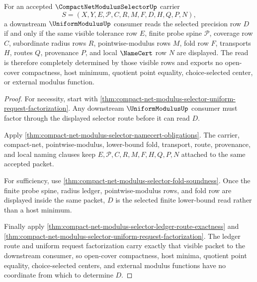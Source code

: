 \begin{theorem}
\label{thm:compact-net-modulus-selector-selected-precision-exactness}
For an accepted $\CompactNetModulusSelectorUp$ carrier
$$
S=(X,Y,E,\mathcal{P},C,R,M,F,D,H,Q,P,N),
$$
a downstream $\UniformModulusUp$ consumer reads the selected precision row $D$
if and only if the same visible tolerance row $E$, finite probe spine
$\mathcal{P}$, coverage row $C$, subordinate radius rows $R$,
pointwise-modulus rows $M$, fold row $F$, transports $H$, routes $Q$,
provenance $P$, and local $\NameCert$ row $N$ are displayed. The read is
therefore completely determined by those visible rows and exports no
open-cover compactness, host minimum, quotient point equality,
choice-selected center, or external modulus function.
\end{theorem}
\begin{proof}
For necessity, start with
\autoref{thm:compact-net-modulus-selector-uniform-request-factorization}. Any
downstream $\UniformModulusUp$ consumer must factor through the displayed
selector route before it can read $D$.

Apply \autoref{thm:compact-net-modulus-selector-namecert-obligations}. The
carrier, compact-net, pointwise-modulus, lower-bound fold, transport, route,
provenance, and local naming clauses keep
$E,\mathcal{P},C,R,M,F,H,Q,P,N$ attached to the same accepted packet.

For sufficiency, use \autoref{thm:compact-net-modulus-selector-fold-soundness}.
Once the finite probe spine, radius ledger, pointwise-modulus rows, and fold
row are displayed inside the same packet, $D$ is the selected finite lower-bound
read rather than a host minimum.

Finally apply \autoref{thm:compact-net-modulus-selector-ledger-route-exactness}
and \autoref{thm:compact-net-modulus-selector-uniform-request-factorization}.
The ledger route and uniform request factorization carry exactly that visible
packet to the downstream consumer, so open-cover compactness, host minima,
quotient point equality, choice-selected centers, and external modulus
functions have no coordinate from which to determine $D$.
\end{proof}

